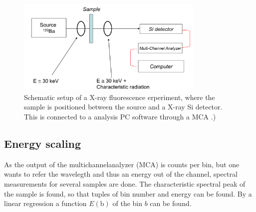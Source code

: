 \begin{figure}
    \centering
    \captionsetup{width=0.9\linewidth}
    \includegraphics[width=0.8\textwidth]{graphics/setup.png}
  \caption{Schematic setup of a X-ray fluorescence erperiment, where the sample is positioned between the source and a X-ray Si detector. This is connected to a analysis PC software through a MCA \cite{instruction}.)}
    \label{fig:setup}
\end{figure}

\subsection{Energy scaling}
\label{sec:E_scaling}
As the output of the multichannelanalyzer (MCA) is counts per bin, but one wants to refer the wavelegth and thus an energy out of the channel, 
spectral measurements for several samples are done.
The characteristic spectral peak of the sample is found, so that tuples of bin number and energy can be found.
By a linear regression a function $E (\text{b})$  of the bin $b$ can be found.
